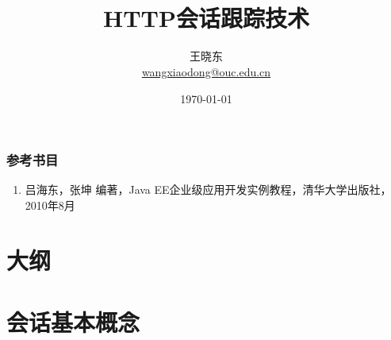 
\title[KevinW@OUC]{\\  
HTTP会话跟踪技术}
\author[王晓东]{王晓东\\
  \href{mailto:wangxiaodong@ouc.edu.cn}{\footnotesize wangxiaodong@ouc.edu.cn}}
\date{\today}


 \frame{\titlepage}

\begin{frame}
\frametitle{参考书目}
\begin{enumerate}
\item 吕海东，张坤 编著，Java EE企业级应用开发实例教程，清华大学出版社，2010年8月
\end{enumerate}  
\end{frame}


\section*{大纲}

\section{会话基本概念}


